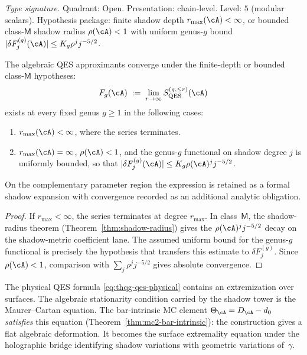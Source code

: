 \begin{theorem}
\label{thm:thqg-qes-convergence}
\textit{Type signature.}
Quadrant: Open. Presentation: chain-level. Level: $5$ (modular scalars).
Hypothesis package: finite shadow depth $r_{\max}(\cA) < \infty$, or
bounded class-$\mathsf M$ shadow radius $\rho(\cA) < 1$ with uniform
genus-$g$ bound $|\delta F^{(g)}_j(\cA)| \le K_g\rho^j j^{-5/2}$.

\medskip
The algebraic QES approximants converge under the finite-depth or
bounded class-$\mathsf M$ hypotheses:
\[
F_g(\cA)
\;:=\;
\lim_{r \to \infty}
S_{\mathrm{QES}}^{(g, \le r)}(\cA)
\]
exists at every fixed genus $g\ge1$ in the following cases:
\begin{enumerate}[label=\textup{(\roman*)}]
\item $r_{\max}(\cA)<\infty$, where the series terminates.
\item $r_{\max}(\cA)=\infty$, $\rho(\cA)<1$, and the genus-$g$
 functional on shadow degree $j$ is uniformly bounded, so that
 $|\delta F^{(g)}_j(\cA)| \le K_g\rho(\cA)^j j^{-5/2}$.
\end{enumerate}
On the complementary parameter region the expression is retained as
a formal shadow expansion with convergence recorded as an additional
analytic obligation.
\end{theorem}

\begin{proof}
If $r_{\max}<\infty$, the series terminates at degree $r_{\max}$.  In
class~$\mathsf M$, the shadow-radius theorem
(Theorem~\ref{thm:shadow-radius}) gives the
$\rho(\cA)^j j^{-5/2}$ decay on the shadow-metric coefficient lane.
The assumed uniform bound for the genus-$g$ functional is precisely
the hypothesis that transfers this estimate to
$\delta F^{(g)}_j$.  Since $\rho(\cA)<1$, comparison with
$\sum_j\rho^j j^{-5/2}$ gives absolute convergence.
\end{proof}

\begin{remark}
\label{rem:thqg-mc-as-extremization}
The physical QES formula \eqref{eq:thqg-qes-physical} contains an
extremization over surfaces.  The algebraic stationarity condition
carried by the shadow tower is the Maurer--Cartan equation.
The bar-intrinsic MC element $\Theta_\cA = D_\cA - d_0$
\emph{satisfies} this equation
(Theorem~\ref{thm:mc2-bar-intrinsic}):
the construction gives a flat algebraic deformation.  It becomes the
surface extremality equation under the holographic bridge identifying
shadow variations with geometric variations of~$\gamma$.
\end{remark}

